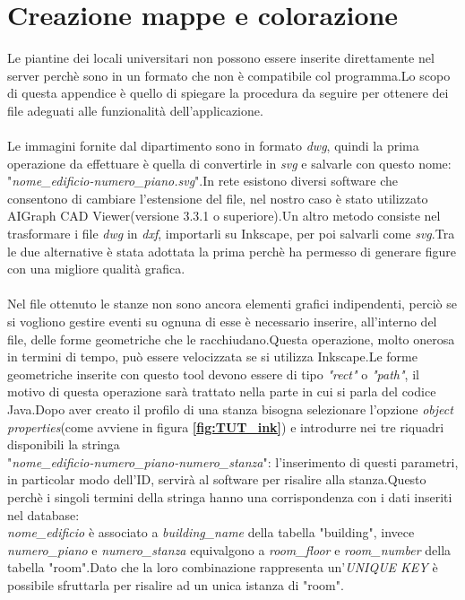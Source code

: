 \section*{Creazione mappe e colorazione}
Le piantine dei locali universitari non possono essere inserite direttamente nel server perch\`e sono in un formato che non \`e compatibile col programma.Lo scopo di questa appendice \`e quello di spiegare la procedura da seguire per  ottenere dei file adeguati alle funzionalit\`a dell'applicazione.\\\\Le immagini fornite dal dipartimento sono in formato \textit{dwg}, quindi la prima operazione da effettuare \`e quella di convertirle in \textit{svg} e salvarle con questo nome: "\textit{nome\_edificio-numero\_piano.svg}".In rete esistono diversi software che consentono di cambiare l'estensione del file, nel nostro caso \`e stato utilizzato AIGraph CAD Viewer(versione 3.3.1 o superiore).Un altro metodo consiste nel trasformare i file \textit{dwg} in \textit{dxf}, importarli su Inkscape, per poi salvarli come \textit{svg}.Tra le due alternative \`e stata adottata la prima perch\`e ha permesso di generare figure con una migliore qualit\`a grafica.\\\\Nel file ottenuto le stanze non sono ancora elementi grafici indipendenti, perci\`o se si vogliono gestire eventi su ognuna di esse \`e necessario inserire, all'interno del file, delle forme geometriche che le racchiudano.Questa operazione, molto onerosa in termini di tempo, pu\`o essere velocizzata se si utilizza Inkscape.Le forme geometriche inserite con questo tool devono essere di tipo \textit{"rect"} o \textit{"path"}, il motivo di questa operazione sar\`a trattato nella parte in cui si parla del codice Java.Dopo aver creato il profilo di una stanza bisogna selezionare l'opzione \textit{object properties}(come avviene in figura \textbf{\ref{fig:TUT_ink}}) e introdurre nei tre riquadri disponibili la stringa 
\\
"\textit{nome\_edificio-numero\_piano-numero\_stanza}": l'inserimento di questi parametri, in particolar modo dell'ID, servir\`a al software per risalire alla stanza.Questo perch\`e i singoli termini della stringa hanno una corrispondenza con i dati inseriti nel database:  \\
\textit{nome\_edificio} \`e associato a \textit{building\_name} della tabella "building", invece \textit{numero\_piano} e \textit{numero\_stanza} equivalgono a \textit{room\_floor} e \textit{room\_number} della tabella "room".Dato che la loro combinazione rappresenta un'\textit{UNIQUE KEY} \`e possibile sfruttarla per risalire ad un unica istanza di "room".
